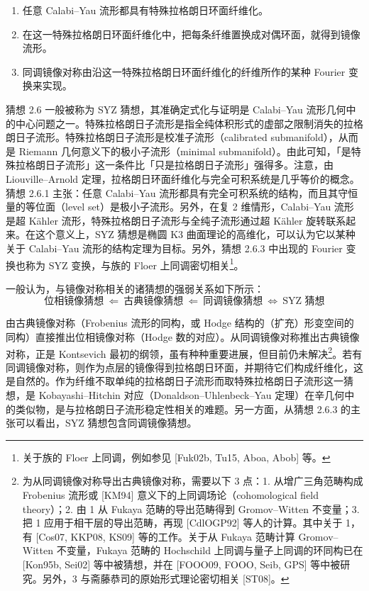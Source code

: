 \begin{enumerate}
    \item 任意 Calabi–Yau 流形都具有特殊拉格朗日环面纤维化。
    \item 在这一特殊拉格朗日环面纤维化中，把每条纤维置换成对偶环面，就得到镜像流形。
    \item 同调镜像对称由沿这一特殊拉格朗日环面纤维化的纤维所作的某种 Fourier 变换来实现。
\end{enumerate}

猜想 2.6 一般被称为 SYZ 猜想，其准确定式化与证明是 Calabi–Yau 流形几何中的中心问题之一。特殊拉格朗日子流形是指全纯体积形式的虚部之限制消失的拉格朗日子流形。特殊拉格朗日子流形是校准子流形（calibrated submanifold），从而是 Riemann 几何意义下的极小子流形（minimal submanifold）。由此可知，「是特殊拉格朗日子流形」这一条件比「只是拉格朗日子流形」强得多。注意，由 Liouville–Arnold 定理，拉格朗日环面纤维化与完全可积系统是几乎等价的概念。猜想 2.6.1 主张：任意 Calabi–Yau 流形都具有完全可积系统的结构，而且其守恒量的等位面（level set）是极小子流形。另外，在复 2 维情形，Calabi–Yau 流形是超 Kähler 流形，特殊拉格朗日子流形与全纯子流形通过超 Kähler 旋转联系起来。在这个意义上，SYZ 猜想是椭圆 K3 曲面理论的高维化，可以认为它以某种关于 Calabi–Yau 流形的结构定理为目标。另外，猜想 2.6.3 中出现的 Fourier 变换也称为 SYZ 变换，与族的 Floer 上同调密切相关\footnote{关于族的 Floer 上同调，例如参见 [Fuk02b, Tu15, Aboa, Abob] 等。}。


一般认为，与镜像对称相关的诸猜想的强弱关系如下所示：
\[
    \text{位相镜像猜想}\ \Leftarrow\ \text{古典镜像猜想}\ \Leftarrow\ \text{同调镜像猜想}\ \Leftrightarrow\ \text{SYZ 猜想}
\]

由古典镜像对称（Frobenius 流形的同构，或 Hodge 结构的（扩充）形变空间的同构）直接推出位相镜像对称（Hodge 数的对应）。从同调镜像对称推出古典镜像对称，正是 Kontsevich 最初的纲领，虽有种种重要进展，但目前仍未解决\footnote{为从同调镜像对称导出古典镜像对称，需要以下 3 点：1. 从增广三角范畴构成 Frobenius 流形或 [KM94] 意义下的上同调场论（cohomological field theory）；2. 由 1 从 Fukaya 范畴的导出范畴得到 Gromov–Witten 不变量；3. 把 1 应用于相干层的导出范畴，再现 [CdlOGP92] 等人的计算。其中关于 1，有 [Cos07, KKP08, KS09] 等的工作。关于从 Fukaya 范畴计算 Gromov–Witten 不变量，Fukaya 范畴的 Hochschild 上同调与量子上同调的环同构已在 [Kon95b, Sei02] 等中被猜想，并在 [FOOO09, FOOO, Seib, GPS] 等中被研究。另外，3 与斋藤恭司的原始形式理论密切相关 [ST08]。}。若有同调镜像对称，则作为点层的镜像得到拉格朗日环面，并期待它们构成纤维化，这是自然的。作为纤维不取单纯的拉格朗日子流形而取特殊拉格朗日子流形这一猜想，是 Kobayashi–Hitchin 对应（Donaldson–Uhlenbeck–Yau 定理）在辛几何中的类似物，是与拉格朗日子流形稳定性相关的难题。另一方面，从猜想 2.6.3 的主张可以看出，SYZ 猜想包含同调镜像猜想。

